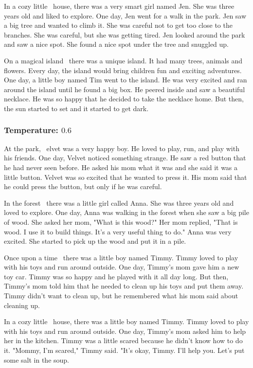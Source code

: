 \documentclass[11pt]{article}
\begin{document}
    In a cozy little \textellipsis\ house, there was a very smart girl named Jen. She was three years old and liked to explore. One day, Jen went for a walk in the park. Jen saw a big tree and wanted to climb it. She was careful not to get too close to the branches. She was careful, but she was getting tired. Jen looked around the park and saw a nice spot. She found a nice spot under the tree and snuggled up.

    On a magical island \textellipsis\ there was a unique island. It had many trees, animals and flowers. Every day, the island would bring children fun and exciting adventures. One day, a little boy named Tim went to the island. He was very excited and ran around the island until he found a big box. He peered inside and saw a beautiful necklace. He was so happy that he decided to take the necklace home. But then, the sun started to set and it started to get dark.

    \subsubsection*{Temperature: $0.6$}

    At the park, \textellipsis\ elvet was a very happy boy. He loved to play, run, and play with his friends. One day, Velvet noticed something strange. He saw a red button that he had never seen before. He asked his mom what it was and she said it was a little button. Velvet was so excited that he wanted to press it. His mom said that he could press the button, but only if he was careful.

    In the forest \textellipsis\ there was a little girl called Anna. She was three years old and loved to explore. One day, Anna was walking in the forest when she saw a big pile of wood. She asked her mom, "What is this wood?" Her mom replied, "That is wood. I use it to build things. It's a very useful thing to do." Anna was very excited. She started to pick up the wood and put it in a pile.

    Once upon a time \textellipsis\ there was a little boy named Timmy. Timmy loved to play with his toys and run around outside. One day, Timmy's mom gave him a new toy car. Timmy was so happy and he played with it all day long. But then, Timmy's mom told him that he needed to clean up his toys and put them away. Timmy didn't want to clean up, but he remembered what his mom said about cleaning up.

    In a cozy little \textellipsis\ house, there was a little boy named Timmy. Timmy loved to play with his toys and run around outside. One day, Timmy's mom asked him to help her in the kitchen. Timmy was a little scared because he didn't know how to do it. "Mommy, I'm scared," Timmy said. "It's okay, Timmy. I'll help you. Let's put some salt in the soup.
\end{document}
